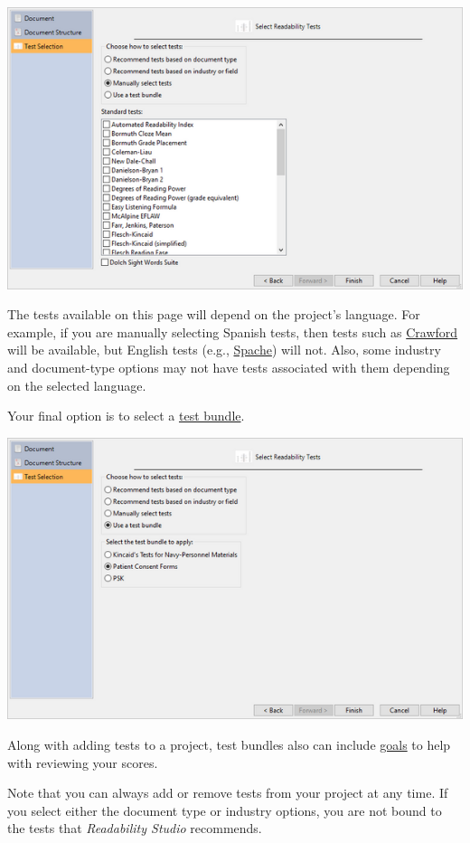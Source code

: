 \documentclass[
]{book}
\theoremstyle{definition}
\theoremstyle{definition}
\theoremstyle{definition}
\theoremstyle{definition}
\theoremstyle{remark}
\begin{document}
\includegraphics{Images/wizardtests.png}

The tests available on this page will depend on the project's language. For example, if you are manually selecting Spanish tests, then tests such as \protect\hyperlink{crawford}{Crawford} will be available, but English tests (e.g., \protect\hyperlink{spache-test}{Spache}) will not. Also, some industry and document-type options may not have tests associated with them depending on the selected language.

Your final option is to select a \protect\hyperlink{test-bundles}{test bundle}.

\includegraphics{Images/wizardbundles.png}

Along with adding tests to a project, test bundles also can include \protect\hyperlink{reviewing-goals}{goals} to help with reviewing your scores.

Note that you can always add or remove tests from your project at any time. If you select either the document type or industry options, you are not bound to the tests that \emph{Readability Studio} recommends.
\end{document}
